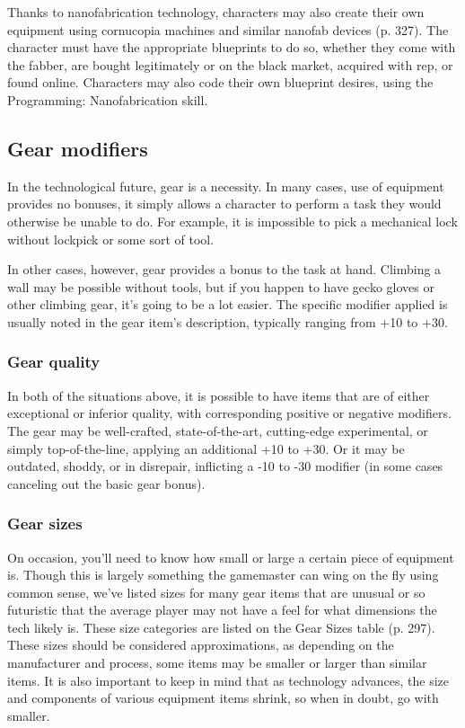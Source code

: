 Thanks to nanofabrication technology, characters may also create their own equipment using cornucopia machines and similar nanofab devices (p. 327). The character must have the appropriate blueprints to do so, whether they come with the fabber, are bought legitimately or on the black market, acquired with rep, or found online. Characters may also code their own blueprint desires, using the Programming: Nanofabrication skill.


\subsection{Gear modifiers}
\label{sec:gear-modifiers}

In the technological future, gear is a necessity. In many cases, use of equipment provides no bonuses, it simply allows a character to perform a task they would otherwise be unable to do. For example, it is impossible to pick a mechanical lock without lockpick or some sort of tool.

In other cases, however, gear provides a bonus to the task at hand. Climbing a wall may be possible without tools, but if you happen to have gecko gloves or other climbing gear, it’s going to be a lot easier. The specific modifier applied is usually noted in the gear item’s description, typically ranging from +10 to +30.

\subsubsection{Gear quality}

In both of the situations above, it is possible to have items that are of either exceptional or inferior quality, with corresponding positive or negative modifiers. The gear may be well-crafted, state-of-the-art, cutting-edge experimental, or simply top-of-the-line, applying an additional +10 to +30. Or it may be outdated, shoddy, or in disrepair, inflicting a -10 to -30 modifier (in some cases canceling out the basic gear bonus).

\subsubsection{Gear sizes}

On occasion, you’ll need to know how small or large a certain piece of equipment is. Though this is largely something the gamemaster can wing on the fly using common sense, we’ve listed sizes for many gear items that are unusual or so futuristic that the average player may not have a feel for what dimensions the tech likely is. These size categories are listed on the Gear Sizes table (p. 297). These sizes should be considered approximations, as depending on the manufacturer and process, some items may be smaller or larger than similar items. It is also important to keep in mind that as technology advances, the size and components of various equipment items shrink, so when in doubt, go with smaller.


